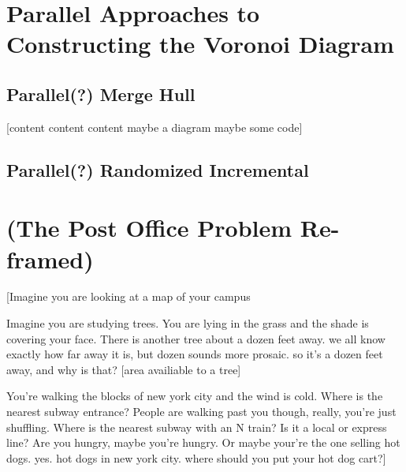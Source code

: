 \documentclass[12pt,twoside]{reedthesis}
\begin{document}
  \chapter*{Parallel Approaches to Constructing the Voronoi Diagram}
    \setcounter{chapter}{2}
    \setcounter{section}{0}

  \section{Parallel(?) Merge Hull} %
  \label{sec:parallel_merge_hull}
  [content content content maybe a diagram maybe some code]

  \section{Parallel(?) Randomized Incremental} %
  \label{sec:parallel_randomized_incremental}


\appendix
  \chapter{(The Post Office Problem Re-framed)}
  \label{appendix_one}
  [Imagine you are looking at a map of your campus\par
  Imagine you are studying trees. You are lying in the grass and the shade is covering your face. There is another tree about a dozen feet away. we all know exactly how far away it is, but dozen sounds more prosaic. so it's a dozen feet away, and why is that? [area availiable to a tree]\par
  You're walking the blocks of new york city and the wind is cold. Where is the nearest subway entrance? People are walking past you though, really, you're just shuffling. Where is the nearest subway with an N train? Is it a local or express line? Are you hungry, maybe you're hungry. Or maybe your're the one selling hot dogs. yes. hot dogs in new york city. where should you put your hot dog cart?] 
\backmatter

\end{document}
